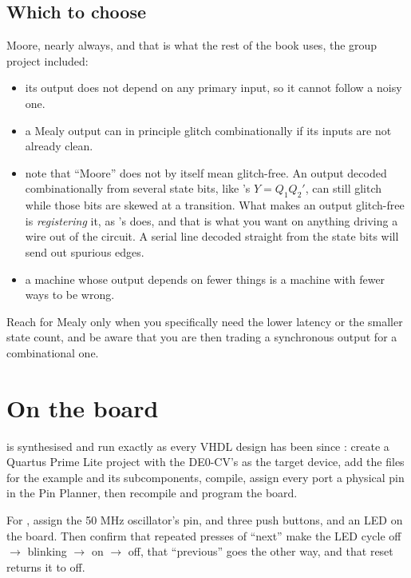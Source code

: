 \subsection*{Which to choose}
Moore, nearly always, and that is what the rest of the book uses, the group project included:
\begin{itemize}
  \item its output does not depend on any primary input, so it cannot follow a noisy one.
  \item a Mealy output can in principle glitch combinationally if its inputs are not already clean.
  \item note that ``Moore'' does not by itself mean glitch-free. An output decoded combinationally
    from several state bits, like 's $Y = Q_1 Q_2'$, can still glitch while
    those bits are skewed at a transition. What makes an output glitch-free is \emph{registering}
    it, as 's  does, and that is what you want on anything driving a
    wire out of the circuit. A serial  line decoded straight from the state bits will send
    out spurious edges.
  \item a machine whose output depends on fewer things is a machine with fewer ways to be wrong.
\end{itemize}

Reach for Mealy only when you specifically need the lower latency or the smaller state count, and be
aware that you are then trading a synchronous output for a combinational one.

\section{On the board}
\label{c8:sec:board}

 is synthesised and run exactly as every VHDL design has been since :
create a Quartus Prime Lite project with the DE0-CV's  as the target device, add
the  files for the example and its subcomponents, compile, assign every port a physical
pin in the Pin Planner, then recompile and program the board.

For , assign  the 50 MHz oscillator's pin,  and
 three push buttons, and  an LED on the board. Then confirm that
repeated presses of ``next'' make the LED cycle off $\to$ blinking $\to$ on $\to$ off, that
``previous'' goes the other way, and that reset returns it to off.

